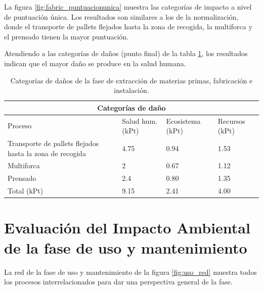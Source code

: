 La figura \ref{fig:fabric_puntuacionunica} muestra las categorías de impacto a nivel de puntuación única. Los resultados son similares a los de la normalización, donde el transporte de pallets flejados hasta la zona de recogida, la multiforca y el prensado tienen la mayor puntuación.

Atendiendo a las categorías de daños (punto final) de la tabla \ref{categoriasdanosfabricacion}, los resultados indican que el mayor daño se produce en la salud humana.

\begin{table}[!htb]
\centering
\begin{tabular}{p{6cm}p{2cm}p{2cm}p{2cm}}
\toprule
\multicolumn{4}{c}{Categorías de daño}\\
\midrule
Proceso & Salud hum. (kPt) & Ecosistema (kPt) & Recursos (kPt)\\
\midrule
Transporte de pallets flejados hasta la zona de recogida & 4.75 & 0.94 & 1.53\\
Multiforca & 2 & 0.67 & 1.12\\
Prensado & 2.4 & 0.80 & 1.35\\
\midrule
Total (kPt) & 9.15 & 2.41 & 4.00\\
\bottomrule
\end{tabular}
\caption{Categorías de daños de la fase de extracción de materias primas, fabricación e instalación.}
\label{categoriasdanosfabricacion}
\end{table}

\section{Evaluación del Impacto Ambiental de la fase de uso y mantenimiento}

La red de la fase de uso y mantenimiento de la figura \ref{fig:uso_red} muestra todos los procesos interrelacionados para dar una perspectiva general de la fase.

